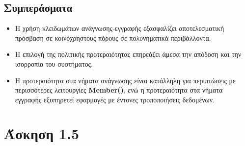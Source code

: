 \documentclass{article}
\begin{document}
\subsection*{Συμπεράσματα}
\begin{itemize}
    \item Η χρήση κλειδωμάτων ανάγνωσης-εγγραφής εξασφαλίζει αποτελεσματική πρόσβαση σε κοινόχρηστους πόρους σε πολυνηματικά περιβάλλοντα.
    \item Η επιλογή της πολιτικής προτεραιότητας επηρεάζει άμεσα την απόδοση και την ισορροπία του συστήματος.
    \item Η προτεραιότητα στα νήματα ανάγνωσης είναι κατάλληλη για περιπτώσεις με περισσότερες λειτουργίες \textbf{Member()}, ενώ η προτεραιότητα στα νήματα εγγραφής εξυπηρετεί εφαρμογές με έντονες τροποποιήσεις δεδομένων.
\end{itemize}
\section*{Άσκηση 1.5}
\end{document}
